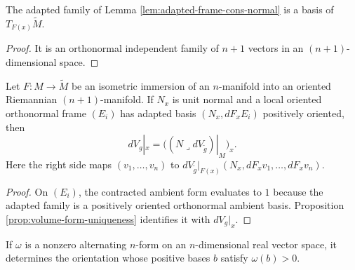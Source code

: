 \begin{lemma}
\label{lem:adapted-frame-ambient-basis}





The adapted family of Lemma \ref{lem:adapted-frame-cons-normal} is a basis of $T_{F(x)}\widetilde M$.
\end{lemma}

\begin{proof}

\sketch It is an orthonormal independent family of $n+1$ vectors in an $(n+1)$-dimensional space.
\end{proof}

\begin{proposition}[Equation (2.17)]
\label{prop:hypersurface-volume-form-formula}





Let $F:M\to\widetilde M$ be an isometric immersion of an $n$-manifold into an oriented Riemannian $(n+1)$-manifold. If $N_x$ is unit normal and a local oriented orthonormal frame $(E_i)$ has adapted basis $(N_x,dF_xE_i)$ positively oriented, then
\begin{equation}
dV_g|_x=\bigl((N\lrcorner dV_{\widetilde g})|_M\bigr)_x. \tag{2.17}
\end{equation}
Here the right side maps $(v_1,\ldots,v_n)$ to $dV_{\widetilde g}|_{F(x)}(N_x,dF_xv_1,\ldots,dF_xv_n)$.
\end{proposition}

\begin{proof}

\sketch On $(E_i)$, the contracted ambient form evaluates to $1$ because the adapted family is a positively oriented orthonormal ambient basis. Proposition \ref{prop:volume-form-uniqueness} identifies it with $dV_g|_x$.
\end{proof}

\begin{lemma}
\label{lem:nonvanishing-top-form-orientation}




If $\omega$ is a nonzero alternating $n$-form on an $n$-dimensional real vector space, it determines the orientation whose positive bases $b$ satisfy $\omega(b)>0$.
\end{lemma}

